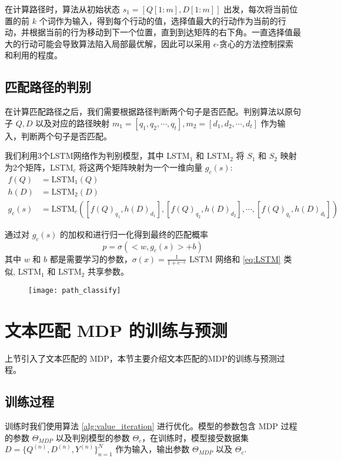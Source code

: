 在计算路径时，算法从初始状态 $s_1 = [Q[1:m], D[1:m]]$ 出发，每次将当前位置的前 $k$ 个词作为输入，得到每个行动的值，选择值最大的行动作为当前的行动，并根据当前的行为移动到下一个位置，直到到达矩阵的右下角。一直选择值最大的行动可能会导致算法陷入局部最优解，因此可以采用 $\epsilon$-贪心的方法控制探索和利用的程度。

\subsection{匹配路径的判别}
\label{sec:path_classify}

在计算匹配路径之后，我们需要根据路径判断两个句子是否匹配。判别算法以原句子 $Q, D$ 以及对应的路径映射 $m_1 = [q_1, q_2, \cdots, q_t], m_2 = [d_1, d_2, \cdots, d_t]$ 作为输入，判断两个句子是否匹配。

我们利用3个LSTM网络作为判别模型，其中 LSTM$_1$ 和 LSTM$_2$ 将 $S_1$ 和 $S_2$ 映射为2个矩阵，LSTM$_c$ 将这两个矩阵映射为一个一维向量 $g_c(s)$:
$$
\begin{aligned}
f(Q) &= \text{LSTM}_1(Q) \\
h(D) &= \text{LSTM}_2(D) \\
g_c(s) &= \text{LSTM}_c([{f(Q)}_{q_1}, {h(D)}_{d_1}], [{f(Q)}_{q_2}, {h(D)}_{d_2}], \cdots, [{f(Q)}_{q_t}, {h(D)}_{d_t}])
\end{aligned}
$$

通过对 $g_c(s)$ 的加权和进行归一化得到最终的匹配概率
$$
p = \sigma(<w, g_c(s)> + b)
$$
其中 $w$ 和 $b$ 都是需要学习的参数，$\sigma(x) = \frac{1}{1+e^{-x}}$
LSTM 网络和 \ref{eq:LSTM} 类似, LSTM$_1$  和 LSTM$_2$ 共享参数。

\begin{figure}[!htbp]
    \centering
    \texttt{[image: path\_classify]}
    \label{fig:path_classify}
\end{figure}

\section{文本匹配 MDP 的训练与预测}
上节引入了文本匹配的 MDP，本节主要介绍文本匹配的MDP的训练与预测过程。
\subsection{训练过程}
训练时我们使用算法 \ref{alg:value_iteration} 进行优化。模型的参数包含 MDP 过程的参数 $\Theta_{MDP}$ 以及判别模型的参数 $\Theta_{c}$，在训练时，模型接受数据集 $D=\{Q^{(n)}, D^{(n)}, Y^{(n)}\}_{n=1}^N$ 作为输入，输出参数 $\Theta_{MDP}$ 以及 $\Theta_{c}$.

